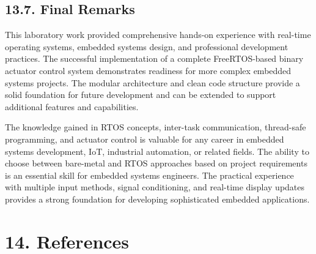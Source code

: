 \documentclass[12pt]{article}
\begin{document}
\subsection*{13.7. Final Remarks}

This laboratory work provided comprehensive hands-on experience with real-time operating systems, embedded systems design, and professional development practices. The successful implementation of a complete FreeRTOS-based binary actuator control system demonstrates readiness for more complex embedded systems projects. The modular architecture and clean code structure provide a solid foundation for future development and can be extended to support additional features and capabilities.

The knowledge gained in RTOS concepts, inter-task communication, thread-safe programming, and actuator control is valuable for any career in embedded systems development, IoT, industrial automation, or related fields. The ability to choose between bare-metal and RTOS approaches based on project requirements is an essential skill for embedded systems engineers. The practical experience with multiple input methods, signal conditioning, and real-time display updates provides a strong foundation for developing sophisticated embedded applications.

\section*{14. References}
\end{document}
